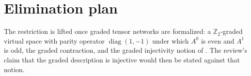 \documentclass{article}
\begin{document}
\section{Elimination plan}
The restriction is lifted once graded tensor networks are formalized: a
$\mathbb Z_2$-graded virtual space with parity operator $\operatorname{diag}(1,-1)$
under which $A^0$ is even and $A^1$ is odd, the graded contraction, and the
graded injectivity notion of \cite{Bultinck2017FermionicMPS}. The review's
claim that the graded description is injective would then be stated against
that notion.



\end{document}
